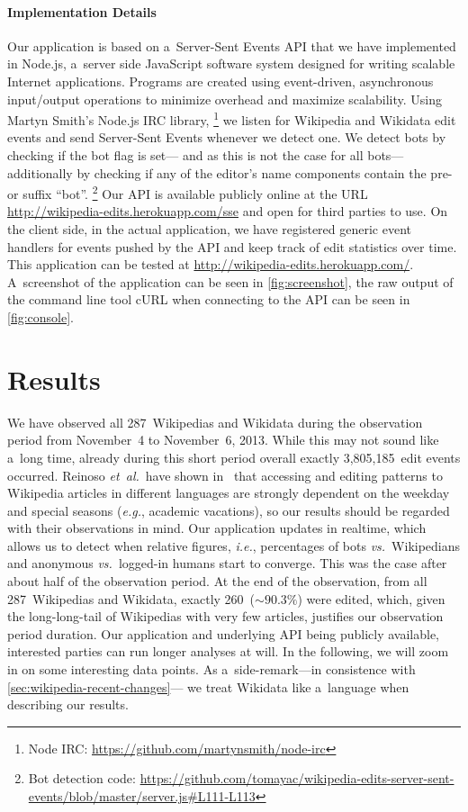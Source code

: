 \documentclass{sig-alternate}
\newcommand{\inlinelistingsize}{\fontsize{8pt}{11pt}}
\let\oldurl\url
\renewcommand{\url}[1]{\inlinelistingsize\oldurl{#1}}
\begin{document}
\paragraph{Implementation Details}

Our application is based on a~Server-Sent Events API
that we have implemented in Node.js,
a~server side JavaScript software system
designed for writing scalable Internet applications.
Programs are created using event-driven,
asynchronous input/output operations
to minimize overhead and maximize scalability.
Using Martyn Smith's Node.js IRC library,%
\footnote{Node IRC:
\url{https://github.com/martynsmith/node-irc}}
we listen for Wikipedia and Wikidata edit events
and send Server-Sent Events whenever we detect one.
We detect bots by checking if the bot flag is set---%
and as this is not the case for all bots---%
additionally by checking if any of the editor's name
components contain the pre- or suffix ``bot''.%
\footnote{Bot detection code:
\url{https://github.com/tomayac/wikipedia-edits-server-sent-events/blob/master/server.js\#L111-L113}}
Our API is available publicly online
at the URL \url{http://wikipedia-edits.herokuapp.com/sse}
and open for third parties to use.
On the client side, in the actual application,
we have registered generic event handlers for events
pushed by the API and keep track of edit statistics over time.
This application can be tested at
\url{http://wikipedia-edits.herokuapp.com/}.
A~screenshot of the application
can be seen in \autoref{fig:screenshot},
the raw output of the command line tool cURL when
connecting to the API can be seen in \autoref{fig:console}.

\section{Results}

We have observed all 287~Wikipedias and Wikidata
during the observation period from November~4
to November~6, 2013.
While this may not sound like a~long time,
already during this short period
overall exactly 3,805,185~edit events occurred.
Reinoso \emph{et~al.}\ have shown in~\cite{reinoso2013tempchar}
that accessing and editing patterns to Wikipedia articles
in different languages are strongly dependent on the weekday
and special seasons (\emph{e.g.}, academic vacations),
so our results should be regarded with their observations in mind.
Our application updates in realtime,
which allows us to detect when relative figures,
\emph{i.e.}, percentages of bots \emph{vs.}\ Wikipedians
and anonymous \emph{vs.}\ logged-in humans start to converge.
This was the case after about half of the observation period.
At the end of the observation,
from all 287~Wikipedias and Wikidata,
exactly 260~($\sim90.3\%$) were edited,
which, given the long-long-tail of Wikipedias
with very few articles, justifies
our observation period duration.
Our application and underlying API being publicly available,
interested parties can run longer analyses at will.
In the following, we will zoom in on some interesting data points.
As a~side-remark---in consistence with
\autoref{sec:wikipedia-recent-changes}---%
we treat Wikidata like a~language when describing our results. 
\end{document}
